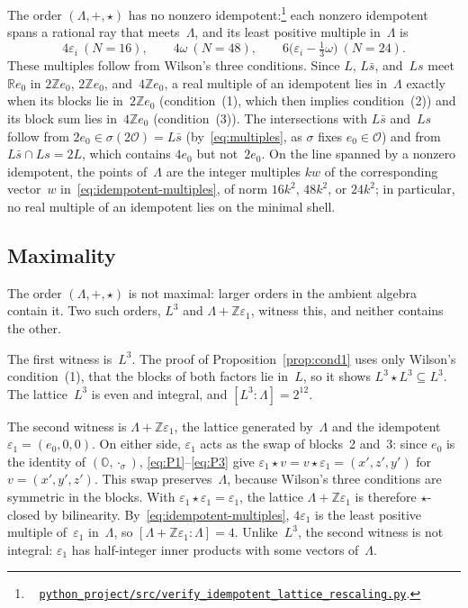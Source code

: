 \documentclass[twoside,english]{paper}
\numberwithin{equation}{section}
\numberwithin{figure}{section}
\theoremstyle{definition}
\theoremstyle{remark}
\newcommand{\OO}{\mathbb{O}}          %
\newcommand{\MO}{\mathcal{O}}         %
\newcommand{\RR}{\mathbb{R}}
\newcommand{\ZZ}{\mathbb{Z}}
\newcommand{\LL}{\Lambda}             %
\newcommand{\Nrm}{N}                  %
\newcommand{\scriptref}[1]{\cite{repo}~%
  \href{https://github.com/koeplinger/leech\_alg/blob/main/python\_project/src/#1}%
  {\nolinkurl{python_project/src/#1}}}
\begin{document}
The order $(\LL, +, \star)$ has no nonzero
idempotent:\footnote{\scriptref{verify\_idempotent\_lattice\_rescaling.py}.}
each nonzero idempotent spans a rational ray that meets~$\LL$, and its
least positive multiple in~$\LL$ is
\begin{equation}\label{eq:idempotent-multiples}
  4\varepsilon_i \ (\Nrm = 16), \qquad
  4\omega \ (\Nrm = 48), \qquad
  6\bigl(\varepsilon_i - \tfrac13\omega\bigr) \ (\Nrm = 24).
\end{equation}
These multiples follow from Wilson's three conditions.  Since $L$,
$L\bar s$, and~$Ls$ meet~$\RR e_0$ in $2\ZZ e_0$, $2\ZZ e_0$,
and~$4\ZZ e_0$, a real multiple of an idempotent lies in~$\LL$ exactly
when its blocks lie in~$2\ZZ e_0$ (condition~(1), which then implies
condition~(2)) and its block sum lies in~$4\ZZ e_0$ (condition~(3)).
The intersections with $L\bar s$ and~$Ls$ follow from
$2e_0 \in \sigma(2\MO) = L\bar s$ (by~\eqref{eq:multiples}, as $\sigma$
fixes $e_0 \in \MO$) and from $L\bar s \cap Ls = 2L$, which contains
$4e_0$ but not~$2e_0$.
On the line spanned by a nonzero idempotent, the points of~$\LL$ are
the integer multiples $kw$ of the corresponding vector~$w$
in~\eqref{eq:idempotent-multiples}, of norm $16k^2$, $48k^2$, or $24k^2$;
in particular, no real multiple of an idempotent lies on the minimal
shell.

\subsection{Maximality}\label{sec:maximality}

The order $(\LL, +, \star)$ is not maximal: larger orders in the
ambient algebra contain it.  Two such orders, $L^3$ and
$\LL + \ZZ\varepsilon_1$, witness this, and neither contains the
other.

The first witness is~$L^3$.  The proof of
Proposition~\ref{prop:cond1} uses only Wilson's condition~(1), that
the blocks of both factors lie in~$L$, so it shows $L^3 \star L^3
\subseteq L^3$.  The lattice~$L^3$ is even and integral, and
$[L^3 : \LL] = 2^{12}$.

The second witness is $\LL + \ZZ\varepsilon_1$, the lattice generated
by~$\LL$ and the idempotent $\varepsilon_1 = (e_0, 0, 0)$.  On either
side, $\varepsilon_1$ acts as the swap of blocks~2 and~3: since $e_0$
is the identity of $(\OO, \cdot_\sigma)$, \eqref{eq:P1}--\eqref{eq:P3}
give $\varepsilon_1 \star v = v \star \varepsilon_1 = (x', z', y')$ for
$v = (x', y', z')$.  This swap preserves~$\LL$, because Wilson's three
conditions are symmetric in the blocks.  With $\varepsilon_1 \star
\varepsilon_1 = \varepsilon_1$, the lattice $\LL + \ZZ\varepsilon_1$ is
therefore $\star$-closed by bilinearity.
By~\eqref{eq:idempotent-multiples}, $4\varepsilon_1$ is the least
positive multiple of~$\varepsilon_1$ in~$\LL$, so
$[\LL + \ZZ\varepsilon_1 : \LL] = 4$.  Unlike~$L^3$, the second witness
is not integral: $\varepsilon_1$ has half-integer inner products with
some vectors of~$\LL$.
\end{document}
